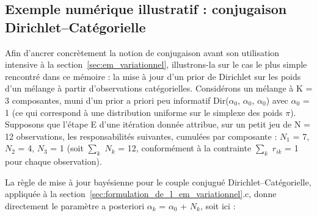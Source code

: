 \subsection{Exemple numérique illustratif : conjugaison Dirichlet--Catégorielle}\label{sec:exemple_numerique_illustratif_conjugaison_dirichlet}
Afin d'ancrer concrètement la notion de conjugaison avant son utilisation intensive à la section~\ref{sec:em_variationnel}, illustrons-la sur le cas le plus simple rencontré dans ce mémoire : la mise à jour d'un prior de Dirichlet sur les poids d'un mélange à partir d'observations catégorielles. Considérons un mélange à K = 3 composantes, muni d'un prior a priori peu informatif Dir($\alpha _{0}$, $\alpha _{0}$, $\alpha _{0}$) avec $\alpha _{0}$ = 1 (ce qui correspond à une distribution uniforme sur le simplexe des poids $\pi $). Supposons que l'étape E d'une itération donnée attribue, sur un petit jeu de N = 12 observations, les responsabilités suivantes, cumulées par composante : $N_{1}$ = 7, $N_{2}$ = 4, $N_{3}$ = 1 (soit $\sum_{k}$ $N_{k}$ = 12, conformément à la contrainte $\sum_{k}$ $r_{ik}$ = 1 pour chaque observation).

La règle de mise à jour bayésienne pour le couple conjugué Dirichlet--Catégorielle, appliquée à la section~\ref{sec:formulation_de_l_em_variationnel}.c, donne directement le paramètre a posteriori $\alpha _{k}$ = $\alpha _{0}$ + $N_{k}$, soit ici :

